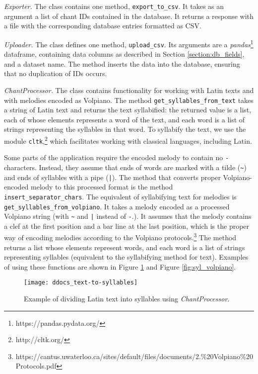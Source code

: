 \emph{Exporter.} The class contains one method, \verb|export_to_csv|. It takes as an argument a list of chant IDs contained in the database. It returns
a response with a file with the corresponding database entries formatted as CSV.

\emph{Uploader.} The class defines one method, \verb|upload_csv|. Its arguments are a \emph{pandas}\footnote{https://pandas.pydata.org/} dataframe, containing
data columns as described in Section \ref{section:db_fields}, and a dataset name. The method inserts the data into the database, ensuring that no duplication 
of IDs occurs.

\emph{ChantProcessor.} The class contains functionality for working with Latin texts and with melodies encoded as Volpiano. The method \verb|get_syllables_from_text|
takes a string of Latin text and returns the text syllabified: the returned value is a list, each of whose elements represents a word of the text, and each word
is a list of strings representing the syllables in that word. To syllabify the text, we use the module \verb|cltk|,\footnote{http://cltk.org/} which facilitates
working with classical languages, including Latin.

Some parts of the application require the encoded melody to contain no \verb|-| characters. Instead, they assume that ends of words are marked with a tilde (\verb|~|) and ends of
syllables with a pipe (\verb=|=). The method that converts proper Volpiano-encoded melody to this processed format is the method \verb|insert_separator_chars|.
The equivalent of syllabifying text for melodies is \verb|get_syllables_from_volpiano|. It takes a melody encoded as a processed Volpiano string (with \verb|~| and \verb=|=
instead of \verb|-|.). It assumes that the
melody contains a clef at the first position and a bar line at the last position, which is the proper way of encoding melodies according to the Volpiano
protocols.\footnote{https://cantus.uwaterloo.ca/sites/default/files/documents/2.\%20Volpiano\%20Protocols.pdf} The method returns a list whose elements represent words,
and each word is a list of strings representing syllables (equivalent to the syllabifying method for text). Examples of using these functions are shown in Figure \ref{fig:syl_text}
and Figure \ref{fig:syl_volpiano}.

\begin{figure}[!h]
\centering
\texttt{[image: ddocs\_text-to-syllables]}
\caption{Example of dividing Latin text into syllables using \emph{ChantProcessor}.}
\label{fig:syl_text}
\end{figure}

